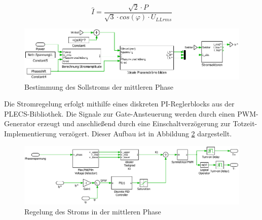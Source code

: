 		\begin{equation}
			\label{eq:Idach}
			 \hat{I} = \dfrac{\sqrt{2} \cdot P   }{ \sqrt{3} \cdot cos(\varphi) \cdot  U_{LLrms} }
		\end{equation}
		
		\begin{figure}
			\centering
			\includegraphics[width=0.9\linewidth]{content/Grafiken/PlecsIAFiy}
			\caption{Bestimmung des Sollstroms der mittleren Phase}
			\label{fig:plecsiafiy}
		\end{figure}
		
Die Stromregelung erfolgt mithilfe eines diskreten PI-Reglerblocks aus der PLECS-Bibliothek. Die Signale zur Gate-Ansteuerung werden durch einen PWM-Generator erzeugt und anschließend durch eine Einschaltverzögerung zur Totzeit-Implementierung verzögert. Dieser Aufbau ist in Abbildung \ref{fig:plecsiafivsk1} dargestellt. 
		\begin{figure}
			\centering
			\includegraphics[width=1\linewidth]{content/Grafiken/PlecsIAFivsK1}
			\caption{Regelung des Stroms in der mittleren Phase}
			\label{fig:plecsiafivsk1}
		\end{figure}
		
	

